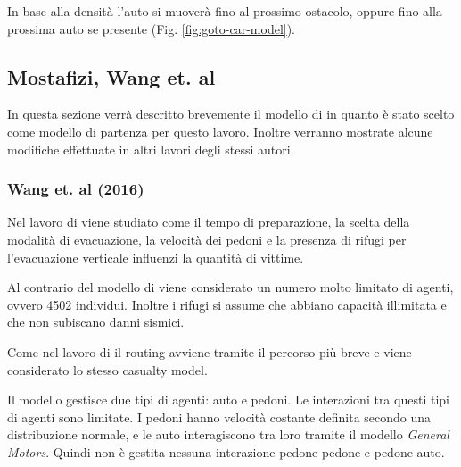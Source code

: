 In base alla densità l'auto si muoverà fino al prossimo ostacolo, oppure fino alla prossima auto se presente (Fig. \ref{fig:goto-car-model}).

\subsection{Mostafizi, Wang et. al}
In questa sezione verrà descritto brevemente il modello di \textcite{wang2016agent} in quanto è stato scelto come modello di partenza per questo lavoro.
Inoltre verranno mostrate alcune modifiche effettuate in altri lavori degli stessi autori.

\subsubsection*{Wang et. al (2016)}

Nel lavoro di \textcite{wang2016agent} viene studiato come il tempo di preparazione, la scelta della modalità di evacuazione, la velocità dei pedoni e la 
presenza di rifugi per l'evacuazione verticale influenzi la quantità di vittime.

Al contrario del modello di \textcite{goto2012tsunami} viene considerato un numero molto limitato di agenti, ovvero 4502 individui. 
Inoltre i rifugi si assume che abbiano capacità illimitata e che non subiscano danni sismici. 

Come nel lavoro di \textcite{goto2012tsunami} il routing avviene tramite il percorso più breve e viene considerato lo stesso casualty model.

Il modello gestisce due tipi di agenti: auto e pedoni. Le interazioni tra questi tipi di agenti sono limitate.
I pedoni hanno velocità costante definita secondo una distribuzione normale, e le auto interagiscono tra loro 
tramite il modello \textit{General Motors}. Quindi non è gestita nessuna interazione pedone-pedone e pedone-auto.




